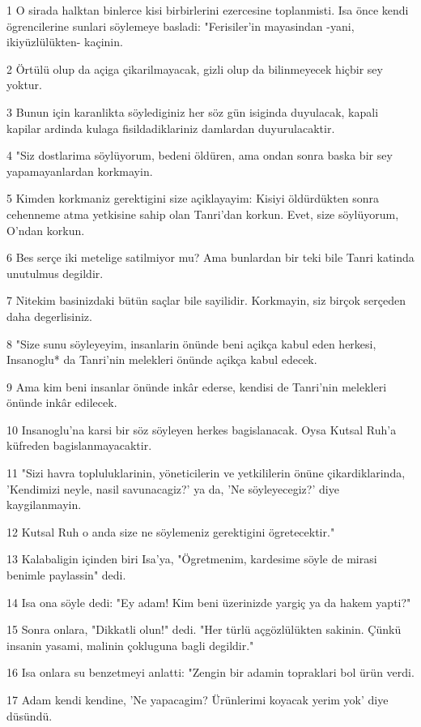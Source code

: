 \par 1 O sirada halktan binlerce kisi birbirlerini ezercesine toplanmisti. Isa önce kendi ögrencilerine sunlari söylemeye basladi: "Ferisiler'in mayasindan -yani, ikiyüzlülükten- kaçinin.
\par 2 Örtülü olup da açiga çikarilmayacak, gizli olup da bilinmeyecek hiçbir sey yoktur.
\par 3 Bunun için karanlikta söylediginiz her söz gün isiginda duyulacak, kapali kapilar ardinda kulaga fisildadiklariniz damlardan duyurulacaktir.
\par 4 "Siz dostlarima söylüyorum, bedeni öldüren, ama ondan sonra baska bir sey yapamayanlardan korkmayin.
\par 5 Kimden korkmaniz gerektigini size açiklayayim: Kisiyi öldürdükten sonra cehenneme atma yetkisine sahip olan Tanri'dan korkun. Evet, size söylüyorum, O'ndan korkun.
\par 6 Bes serçe iki metelige satilmiyor mu? Ama bunlardan bir teki bile Tanri katinda unutulmus degildir.
\par 7 Nitekim basinizdaki bütün saçlar bile sayilidir. Korkmayin, siz birçok serçeden daha degerlisiniz.
\par 8 "Size sunu söyleyeyim, insanlarin önünde beni açikça kabul eden herkesi, Insanoglu* da Tanri'nin melekleri önünde açikça kabul edecek.
\par 9 Ama kim beni insanlar önünde inkâr ederse, kendisi de Tanri'nin melekleri önünde inkâr edilecek.
\par 10 Insanoglu'na karsi bir söz söyleyen herkes bagislanacak. Oysa Kutsal Ruh'a küfreden bagislanmayacaktir.
\par 11 "Sizi havra topluluklarinin, yöneticilerin ve yetkililerin önüne çikardiklarinda, 'Kendimizi neyle, nasil savunacagiz?' ya da, 'Ne söyleyecegiz?' diye kaygilanmayin.
\par 12 Kutsal Ruh o anda size ne söylemeniz gerektigini ögretecektir."
\par 13 Kalabaligin içinden biri Isa'ya, "Ögretmenim, kardesime söyle de mirasi benimle paylassin" dedi.
\par 14 Isa ona söyle dedi: "Ey adam! Kim beni üzerinizde yargiç ya da hakem yapti?"
\par 15 Sonra onlara, "Dikkatli olun!" dedi. "Her türlü açgözlülükten sakinin. Çünkü insanin yasami, malinin çokluguna bagli degildir."
\par 16 Isa onlara su benzetmeyi anlatti: "Zengin bir adamin topraklari bol ürün verdi.
\par 17 Adam kendi kendine, 'Ne yapacagim? Ürünlerimi koyacak yerim yok' diye düsündü.
